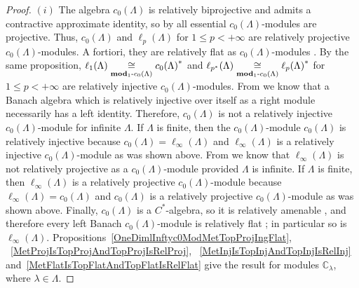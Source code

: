 \begin{proof} $(i)$ The algebra $c_0(\Lambda)$ is relatively biprojective
\cite[theorem IV.5.26]{HelHomolBanTopAlg} and admits a contractive approximate
identity, so by \cite[theorem 7.1.60]{HelBanLocConvAlg} all essential
$c_0(\Lambda)$-modules are projective. Thus, $c_0(\Lambda)$ and $\ell_p(\Lambda)$
for $1\leq p<+\infty$ are relatively projective $c_0(\Lambda)$-modules. A
fortiori, they are relatively flat as $c_0(\Lambda)$-modules
\cite[proposition 7.1.40]{HelBanLocConvAlg}. By the same proposition,
$\ell_1(\Lambda)\mathrel{\mathop{\cong}\limits_{\mathbf{mod}_1\text{-}c_0(\Lambda)}}{c_0(\Lambda)}^*$ and
$\ell_{p^*}(\Lambda)\mathrel{\mathop{\cong}\limits_{\mathbf{mod}_1\text{-}c_0(\Lambda)}}{\ell_p(\Lambda)}^*$ for
$1\leq p<+\infty$ are relatively injective $c_0(\Lambda)$-modules. From
\cite[proposition 2.2.8 (i)]{RamsHomPropSemgroupAlg} we know that a Banach
algebra which is relatively injective over itself as a right module necessarily 
has a left identity. Therefore, $c_0(\Lambda)$ is not a relatively injective
$c_0(\Lambda)$-module for infinite $\Lambda$. If $\Lambda$ is finite, then
the $c_0(\Lambda)$-module $c_0(\Lambda)$ is relatively injective because
$c_0(\Lambda)=\ell_\infty(\Lambda)$ and $\ell_\infty(\Lambda)$ is a relatively
injective $c_0(\Lambda)$-module as was shown above. From
\cite[corollary V.2.16(II)]{HelHomolBanTopAlg} we know that
$\ell_\infty(\Lambda)$ is not relatively projective as a $c_0(\Lambda)$-module
provided $\Lambda$ is infinite. If $\Lambda$ is finite, then
$\ell_\infty(\Lambda)$ is a relatively projective $c_0(\Lambda)$-module because
$\ell_\infty(\Lambda)=c_0(\Lambda)$ and $c_0(\Lambda)$ is a relatively projective
$c_0(\Lambda)$-module as was shown above. Finally, $c_0(\Lambda)$ is a
$C^*$-algebra, so it is relatively amenable \cite[theorem 7.1.87]{HelBanLocConvAlg}, and therefore every left Banach $c_0(\Lambda)$-module is relatively
flat \cite[theorem 7.1.60]{HelBanLocConvAlg}; in particular so
is $\ell_\infty(\Lambda)$.
Propositions~\ref{OneDimlInftyc0ModMetTopProjIngFlat},
~\ref{MetProjIsTopProjAndTopProjIsRelProj},
~\ref{MetInjIsTopInjAndTopInjIsRelInj}
and~\ref{MetFlatIsTopFlatAndTopFlatIsRelFlat} give the result for modules
$\mathbb{C}_\lambda$, where $\lambda\in\Lambda$.


\end{proof}
